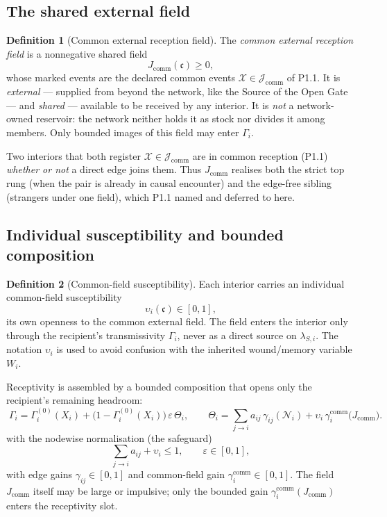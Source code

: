 \documentclass[11pt,a4paper]{article}
\theoremstyle{definition}
\newtheorem{definition}{Definition}[section]
\theoremstyle{plain}
\theoremstyle{remark}
\begin{document}
\subsection{The shared external field}

\begin{definition}[Common external reception field]\label{def:jcomm}
The \emph{common external reception field} is a nonnegative shared field
\[
J_{\mathrm{comm}}(\mathfrak c)\ge0,
\]
whose marked events are the declared common events
\(\mathcal X\in\mathcal J_{\mathrm{comm}}\) of P1.1. It is \emph{external} ---
supplied from beyond the network, like the Source of the Open Gate --- and
\emph{shared} --- available to be received by any interior. It is \emph{not} a
network-owned reservoir: the network neither holds it as stock nor divides it
among members. Only bounded images of this field may enter \(\Gamma_i\).
\end{definition}

Two interiors that both register \(\mathcal X\in\mathcal J_{\mathrm{comm}}\) are in common
reception (P1.1) \emph{whether or not} a direct edge joins them. Thus \(J_{\mathrm{comm}}\)
realises both the strict top rung (when the pair is already in causal encounter) and the
edge-free sibling (strangers under one field), which P1.1 named and deferred to here.

\subsection{Individual susceptibility and bounded composition}

\begin{definition}[Common-field susceptibility]\label{def:suscept}
Each interior carries an individual common-field susceptibility
\[
\upsilon_i(\mathfrak c)\in[0,1],
\]
its own openness to the common external field. The field enters the interior only
through the recipient's transmissivity \(\Gamma_i\), never as a direct source on
\(\lambda_{S,i}\). The notation \(\upsilon_i\) is used to avoid confusion with the
inherited wound/memory variable \(W_i\).
\end{definition}

Receptivity is assembled by a bounded composition that opens only the recipient's remaining
headroom:
\[
\boxed{\;
\Gamma_i
=
\Gamma_i^{(0)}(X_i)
+
\bigl(1-\Gamma_i^{(0)}(X_i)\bigr)\,\varepsilon\,\Theta_i,
\qquad
\Theta_i
=
\sum_{j\to i} a_{ij}\,\gamma_{ij}(\mathcal N_i)
+
\upsilon_i\,\gamma_i^{\mathrm{comm}}\bigl(J_{\mathrm{comm}}\bigr).
\;}
\]
with the nodewise normalisation (the safeguard)
\[
\sum_{j\to i} a_{ij}+\upsilon_i\le1,
\qquad
\varepsilon\in[0,1],
\]
with edge gains \(\gamma_{ij}\in[0,1]\) and common-field gain
\(\gamma_i^{\mathrm{comm}}\in[0,1]\). The field \(J_{\mathrm{comm}}\) itself may be
large or impulsive; only the bounded gain
\(\gamma_i^{\mathrm{comm}}(J_{\mathrm{comm}})\) enters the receptivity slot.
\end{document}
